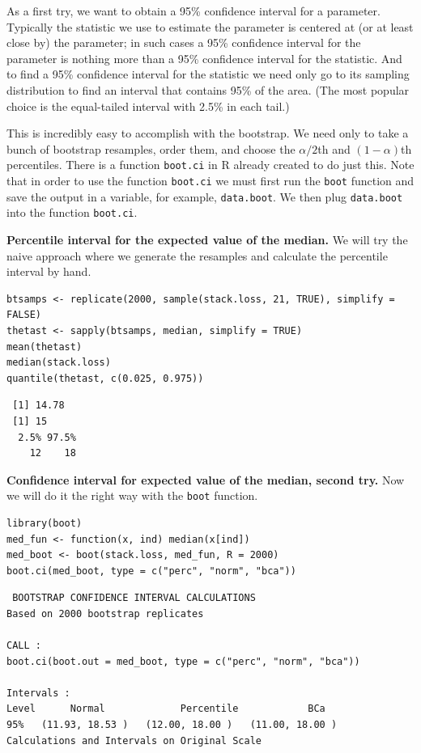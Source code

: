 \documentclass[captions=tableheading]{scrbook}
\begin{document}
As a first try, we want to obtain a 95\% confidence interval for a parameter. Typically the statistic we use to estimate the parameter is centered at (or at least close by) the parameter; in such cases a 95\% confidence interval for the parameter is nothing more than a 95\% confidence interval for the statistic. And to find a 95\% confidence interval for the statistic we need only go to its sampling distribution to find an interval that contains 95\% of the area. (The most popular choice is the equal-tailed interval with 2.5\% in each tail.)

This is incredibly easy to accomplish with the bootstrap. We need only to take a bunch of bootstrap resamples, order them, and choose the \(\alpha/2\)th and \((1-\alpha)\)th percentiles. There is a function \texttt{boot.ci} in \textsf{R} already created to do just this. Note that in order  to use the function \texttt{boot.ci} we must first run the \texttt{boot} function and save the output in a variable, for example, \texttt{data.boot}. We then plug \texttt{data.boot} into the function \texttt{boot.ci}.


\begin{example}
\label{exa:percentile-interval-median-first}

\textbf{Percentile interval for the expected value of the median.} We will try the naive approach where we generate the resamples and calculate the percentile interval by hand.


\begin{verbatim}
btsamps <- replicate(2000, sample(stack.loss, 21, TRUE), simplify = FALSE)
thetast <- sapply(btsamps, median, simplify = TRUE)
mean(thetast)
median(stack.loss)
quantile(thetast, c(0.025, 0.975))
\end{verbatim}

\begin{verbatim}
 [1] 14.78
 [1] 15
  2.5% 97.5% 
    12    18
\end{verbatim}

\end{example}

\begin{example}
\textbf{Confidence interval for expected value of the median, second try.}  Now we will do it the right way with the \texttt{boot} function.


\begin{verbatim}
library(boot)
med_fun <- function(x, ind) median(x[ind])
med_boot <- boot(stack.loss, med_fun, R = 2000)
boot.ci(med_boot, type = c("perc", "norm", "bca"))
\end{verbatim}


\begin{verbatim}
 BOOTSTRAP CONFIDENCE INTERVAL CALCULATIONS
Based on 2000 bootstrap replicates

CALL : 
boot.ci(boot.out = med_boot, type = c("perc", "norm", "bca"))

Intervals : 
Level      Normal             Percentile            BCa          
95%   (11.93, 18.53 )   (12.00, 18.00 )   (11.00, 18.00 )  
Calculations and Intervals on Original Scale
\end{verbatim}

\end{example}
\end{document}
